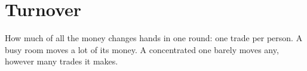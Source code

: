 \section{Turnover}

How much of all the money changes hands in one round: one trade per person.
A busy room moves a lot of its money. A concentrated one barely moves any, however many trades it makes.

\begin{figure}
\end{figure}
